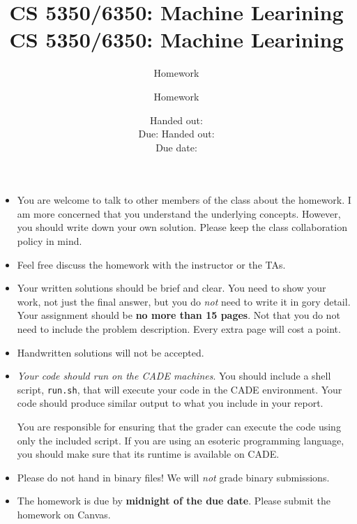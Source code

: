 \documentclass[12pt, fullpage,letterpaper]{article}
\title{CS 5350/6350: Machine Learining \semester}
\author{Homework \assignmentId}
\date{Handed out: \releaseDate\\
	Due: \dueDate}
\title{CS 5350/6350: Machine Learining \semester}
\author{Homework \assignmentId}
\date{Handed out: \releaseDate\\
  Due date: \dueDate}
\begin{document}
\maketitle


{\footnotesize
	\begin{itemize}
		\item You are welcome to talk to other members of the class about
		the homework. I am more concerned that you understand the
		underlying concepts. However, you should write down your own
		solution. Please keep the class collaboration policy in mind.
		
		\item Feel free discuss the homework with the instructor or the TAs.
		
		\item Your written solutions should be brief and clear. You need to
		show your work, not just the final answer, but you do \emph{not}
		need to write it in gory detail. Your assignment should be {\bf no
			more than 15 pages}. Not that you do not need to include the problem description. Every extra page will cost a point.
		
		\item Handwritten solutions will not be accepted.
		
		
		\item {\em Your code should run on the CADE machines}. You should
		include a shell script, {\tt run.sh}, that will execute your code
		in the CADE environment. Your code should produce similar output
		to what you include in your report.
		
		You are responsible for ensuring that the grader can execute the
		code using only the included script. If you are using an
		esoteric programming language, you should make sure that its
		runtime is available on CADE.
		
		\item Please do not hand in binary files! We will {\em not} grade
		binary submissions.
		
		\item The homework is due by \textbf{midnight of the due date}. Please submit
		the homework on Canvas.
		
	\end{itemize}
}
\end{document}
